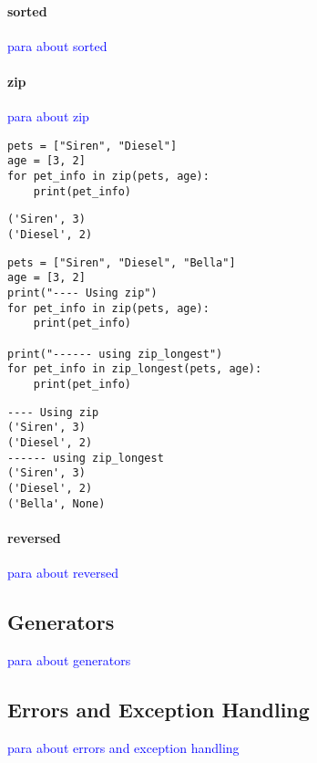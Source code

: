 \paragraph{sorted}

\textcolor{blue}{para about sorted}

\paragraph{zip}

\textcolor{blue}{para about zip}

\begin{lstlisting}[style=pyInStyle]
pets = ["Siren", "Diesel"]
age = [3, 2]
for pet_info in zip(pets, age):
    print(pet_info)
\end{lstlisting}
\begin{lstlisting}[style=pyOutStyle]
('Siren', 3)
('Diesel', 2)
\end{lstlisting}

\begin{lstlisting}[style=pyInStyle]
pets = ["Siren", "Diesel", "Bella"]
age = [3, 2]
print("---- Using zip")
for pet_info in zip(pets, age):
    print(pet_info)

print("------ using zip_longest")
for pet_info in zip_longest(pets, age):
    print(pet_info)
\end{lstlisting}
\begin{lstlisting}[style=pyOutStyle]
---- Using zip
('Siren', 3)
('Diesel', 2)
------ using zip_longest
('Siren', 3)
('Diesel', 2)
('Bella', None)
\end{lstlisting}

\paragraph{reversed}

\textcolor{blue}{para about reversed}

\subsection{Generators}

\textcolor{blue}{para about generators}

\subsection{Errors and Exception Handling}

\textcolor{blue}{para about errors and exception handling}

